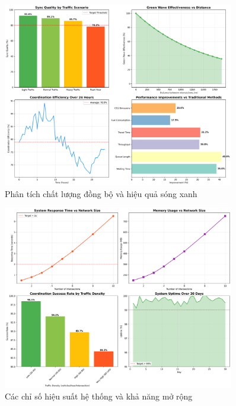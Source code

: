 \begin{figure}[htbp]
    \centering
    \includegraphics[width=0.9\textwidth]{figures/fig_sync_quality_analysis.png}
    \caption{Phân tích chất lượng đồng bộ và hiệu quả sóng xanh}
    \label{fig:sync_quality}
\end{figure}

\begin{figure}[htbp]
    \centering
    \includegraphics[width=0.9\textwidth]{figures/fig_system_performance.png}
    \caption{Các chỉ số hiệu suất hệ thống và khả năng mở rộng}
    \label{fig:system_performance}
\end{figure}
